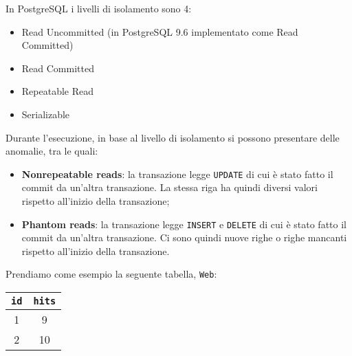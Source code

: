 \documentclass[a4paper, 10pt, titlepage]{article}
\begin{document}
	In PostgreSQL i livelli di isolamento sono 4:
		\begin{itemize}
			\item Read Uncommitted (in PostgreSQL 9.6 implementato come Read Committed)
			\item Read Committed
			\item Repeatable Read
			\item Serializable	
		\end{itemize}
		Durante l'esecuzione, in base al livello di isolamento si possono presentare delle anomalie, tra le quali:
		\begin{itemize}
		\item \textbf{Nonrepeatable reads}: la transazione legge \lstinline|UPDATE| di cui è stato fatto il commit da un'altra transazione. La stessa riga ha quindi diversi valori rispetto all'inizio della transazione;
		\item \textbf{Phantom reads}: la transazione legge \lstinline|INSERT| e \lstinline|DELETE| di cui è stato fatto il commit da un'altra transazione. Ci sono quindi nuove righe o righe mancanti rispetto all'inizio della transazione.
		\end{itemize}\medskip
		Prendiamo come esempio la seguente tabella, 
		\lstinline|Web|:
		\begin{tabular}{cc}
			\toprule
			\lstinline|id| & \lstinline|hits| \\
			\midrule
			1 & 9 \\
			2 & 10 \\
			\midrule
		\end{tabular}

		
\end{document}
